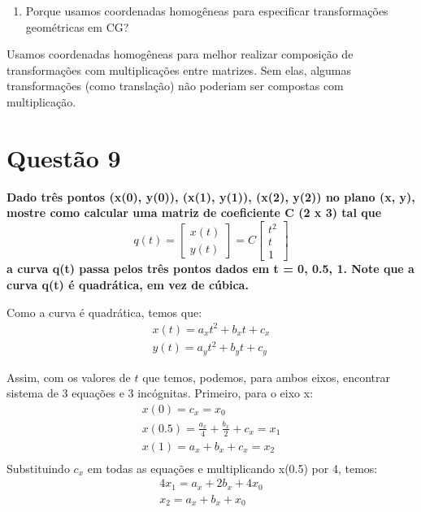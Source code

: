 \documentclass[12pt]{article}
\begin{document}
\begin{enumerate}[label=\alph*), resume]
    \item Porque usamos coordenadas homogêneas para especificar transformações geométricas em CG?
\end{enumerate}

Usamos coordenadas homogêneas para melhor realizar composição de transformações com multiplicações entre matrizes. Sem elas, algumas transformações (como translação) não poderiam ser compostas com multiplicação.

\section*{Questão 9}
{\bfseries Dado três pontos (x(0), y(0)), (x(1), y(1)), (x(2), y(2)) no plano (x, y), mostre
como calcular uma matriz de coeficiente C (2 x 3) tal que 
\begin{equation*}
    q(t) =  
    \begin{bmatrix}
    x(t) \\
    y(t) 
    \end{bmatrix}
    = C
    \begin{bmatrix}
    t^2 \\
    t \\
    1
    \end{bmatrix}
\end{equation*}
a curva q(t) passa pelos três pontos dados em t = 0, 0.5, 1. Note que a curva q(t) é quadrática, em vez de cúbica.}

Como a curva é quadrática, temos que:
\begin{gather*}
    x(t) = a_xt^2 + b_xt + c_x \\
    y(t) = a_yt^2 + b_yt + c_y 
\end{gather*}{}

Assim, com os valores de $t$ que temos, podemos, para ambos eixos, encontrar sistema de 3 equações e 3 incógnitas. Primeiro, para o eixo x:
\begin{gather*}
    x(0) = c_x = x_0\\
    x(0.5) = \frac{a_x}{4} + \frac{b_x}{2} + c_x = x_1\\
    x(1) = a_x + b_x + c_x = x_2\\
\end{gather*}
Substituindo $c_x$ em todas as equações e multiplicando x(0.5) por 4, temos:
\begin{gather*}
    4x_1 = a_x + 2b_x + 4x_0\\
    x_2 = a_x + b_x + x_0
\end{gather*}{}
\end{document}
